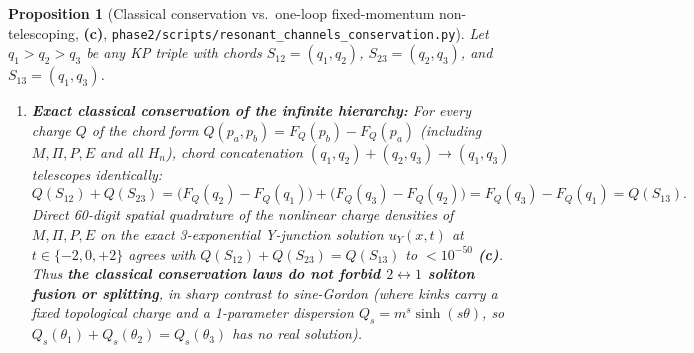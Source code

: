 \documentclass[11pt,a4paper]{article}
\newcommand{\Lc}{\textsf{\textbf{(c)}}\xspace}
\newcommand{\scons}{\texttt{phase2/\allowbreak scripts/\allowbreak resonant\_\allowbreak channels\_\allowbreak conservation.py}}
\newtheorem{proposition}{Proposition}[section]
\theoremstyle{remark}
\begin{document}
\begin{proposition}[Classical conservation vs.\ one-loop fixed-momentum non-telescoping, \Lc, \scons]\label{prop:fusion_conservation}
Let $q_1 > q_2 > q_3$ be any KP triple with chords $S_{12}=(q_1,q_2)$,
$S_{23}=(q_2,q_3)$, and $S_{13}=(q_1,q_3)$.
\begin{enumerate}
\item \textbf{Exact classical conservation of the infinite hierarchy:}
For every charge $Q$ of the chord form $Q(p_a,p_b) = F_Q(p_b) - F_Q(p_a)$
(including $M,\Pi,P,E$ and all $H_n$), chord concatenation $(q_1,q_2)+(q_2,q_3)\to(q_1,q_3)$
telescopes identically:
\begin{equation}\label{eq:chord_telescope}
  Q(S_{12}) + Q(S_{23}) = \big(F_Q(q_2) - F_Q(q_1)\big) + \big(F_Q(q_3) - F_Q(q_2)\big)
  = F_Q(q_3) - F_Q(q_1) = Q(S_{13}).
\end{equation}
Direct 60-digit spatial quadrature of the nonlinear charge densities of $M,\Pi,P,E$
on the exact 3-exponential Y-junction solution $u_Y(x,t)$ at $t \in \{-2,0,+2\}$
agrees with $Q(S_{12})+Q(S_{23}) = Q(S_{13})$ to $< 10^{-50}$ \Lc.
Thus \textbf{the classical conservation laws do not forbid $2\leftrightarrow 1$
soliton fusion or splitting}, in sharp contrast to sine-Gordon (where kinks carry
a fixed topological charge and a 1-parameter dispersion $Q_s = m^s\sinh(s\theta)$,
so $Q_s(\theta_1)+Q_s(\theta_2)=Q_s(\theta_3)$ has no real solution).


\end{enumerate}
\end{proposition}
\end{document}
